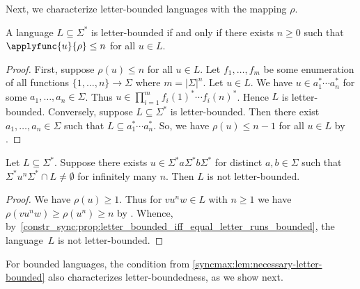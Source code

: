 Next, we characterize letter-bounded languages with the mapping $\rho$.

\begin{proposition}
	\label{constr_sync:prop:letter_bounded_iff_equal_letter_runs_bounded}
	A language $L \subseteq \Sigma^*$ is letter-bounded if and only if there
	exists $n \ge 0$ such that $\applyfunc{u}{\rho} \le n$
	for all $u \in L$.
\end{proposition}
\begin{proof}  
	First, suppose $\rho(u) \le n$ for all $u \in L$.
	Let $f_1, \ldots, f_m$ be some enumeration
	of all functions  $\{1,\ldots,n\} \to \Sigma$
	where $m = |\Sigma|^n$.
	Let $u \in L$.
	We have $u \in a_1^* \cdots a_n^*$
	for some $a_1, \ldots, a_n \in \Sigma$.
	Thus $u \in \prod_{i=1}^{m} f_i(1)^* \cdots f_i(n)^*$.
	Hence $L$ is letter-bounded.	
	Conversely, suppose $L \subseteq \Sigma^*$ is letter-bounded. Then there exist $a_1, \ldots, a_n \in \Sigma$
	such that $L \subseteq a_1^* \cdots a_n^*$. So, we have $\rho(u) \le n - 1$ for all $u \in L$
	by .
\end{proof}

\begin{corollary} \label{syncmax:lem:necessary-letter-bounded}
	Let $L \subseteq \Sigma^*$.
	Suppose there exists $u \in  \Sigma^* a \Sigma^* b \Sigma^*$
	for distinct $a,b \in \Sigma$
	such that $\Sigma^* u^n \Sigma^* \cap L \ne \emptyset$
	for infinitely many $n$.
	Then $L$ is not letter-bounded.
\end{corollary}
\begin{proof}
	We have $\rho(u) \ge 1$.
	Thus for $vu^nw \in L$ with $n \ge 1$
	we have $\rho(v u^n w) \ge \rho(u^n) \ge n$
	by .
	Whence, by~\cref{constr_sync:prop:letter_bounded_iff_equal_letter_runs_bounded},
	the language~$L$ is not letter-bounded.
\end{proof}

For bounded languages, the condition from \cref{syncmax:lem:necessary-letter-bounded} also characterizes letter-boundedness, as we show next.

